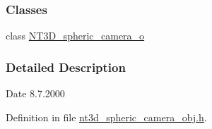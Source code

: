 \subsubsection*{Classes}
\begin{DoxyCompactItemize}
\item 
class \hyperlink{class_n_t3_d__spheric__camera__o}{NT3D\_\-spheric\_\-camera\_\-o}
\end{DoxyCompactItemize}


\subsubsection{Detailed Description}
\begin{DoxyDate}{Date}
8.7.2000 
\end{DoxyDate}


Definition in file \hyperlink{nt3d__spheric__camera__obj_8h_source}{nt3d\_\-spheric\_\-camera\_\-obj.h}.

